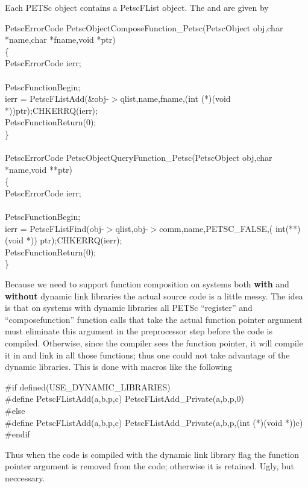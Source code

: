 \documentclass[twoside,12pt]{../sty/report_petsc}
\begin{document}
Each PETSc object contains a PetscFList object. The  and 
 are given by 

\begin{tabbing}
PetscErrorCode PetscObjectComposeFunction\_Petsc(PetscObject obj,char *name,char *fname,void *ptr)\\
\{\\
  PetscErrorCode ierr;\\
\\
  PetscFunctionBegin;\\
  ierr = PetscFListAdd(\&obj-$>$qlist,name,fname,(int (*)(void *))ptr);CHKERRQ(ierr);\\
  PetscFunctionReturn(0);\\
\}\\
\\
PetscErrorCode PetscObjectQueryFunction\_Petsc(PetscObject obj,char *name,void **ptr)\\
\{\\
  PetscErrorCode ierr;\\
\\
  PetscFunctionBegin;\\
  ierr = PetscFListFind(obj-$>$qlist,obj-$>$comm,name,PETSC\_FALSE,( int(**)(void *)) ptr);CHKERRQ(ierr);\\
  PetscFunctionReturn(0);\\
\}
\end{tabbing}

  Because we need to support function composition on systems both {\bf with} and {\bf without} 
dynamic link libraries the actual source code is a little messy. The idea is that
on systems with dynamic libraries all PETSc ``register'' and ``composefunction''
function calls that take the actual 
function pointer argument must eliminate this argument in the preprocessor step before 
the code is compiled. Otherwise, since the compiler sees the function pointer, it will 
compile it in and link in all those functions; thus one could not take advantage of the
dynamic libraries. This is done with macros like the following
\begin{tabbing}
\#if defined(USE\_DYNAMIC\_LIBRARIES)\\
\#define       PetscFListAdd(a,b,p,c) PetscFListAdd\_Private(a,b,p,0)\\
\#else\\
\#define       PetscFListAdd(a,b,p,c) PetscFListAdd\_Private(a,b,p,(int (*)(void *))c)\\
\#endif\\
\end{tabbing}
Thus when the code is compiled with the dynamic link library flag the function pointer 
argument is removed from the code; otherwise it is retained. Ugly, but neccessary.
\end{document}

